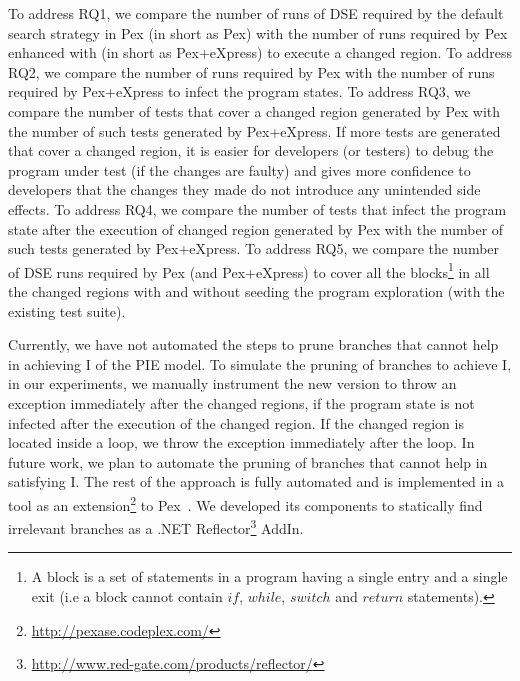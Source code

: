  To address RQ1, we compare the number of runs of DSE required by the default search strategy in Pex (in short as Pex) with the number of runs required by Pex enhanced with  (in short as Pex+eXpress) to execute a changed region. To address RQ2, we compare the number of runs required by Pex with the number of runs required by Pex+eXpress to infect the program states. 
To address RQ3, we compare the number of tests that cover a changed region generated by Pex with the number of such tests generated by Pex+eXpress. If more tests are generated that cover a changed region, it is easier for developers (or testers) to debug the program under test (if the changes are faulty) and gives more confidence to developers that the changes they made do not introduce any unintended side effects.
To address RQ4, we compare the number of tests that infect the program state after the execution of changed region generated by Pex with the number of such tests generated by Pex+eXpress. To address RQ5, we compare the number of DSE runs required by Pex (and Pex+eXpress) to cover all the blocks\footnote{A block is a set of statements in a program having a single entry and a single exit (i.e a block cannot contain $if$, $while$, $switch$ and $return$ statements).} in all the changed regions with and without seeding the program exploration (with the existing test suite).


Currently, we have not automated the steps to prune branches that cannot help in achieving I of the PIE model. To simulate the pruning of branches to achieve I, in our experiments, we manually instrument the new version to throw an exception immediately  after the changed regions, if the program state is not infected after the execution of the changed region. If the changed region is located inside a loop, we throw the exception immediately after the loop.
In future work, we plan to automate the pruning of branches that cannot help in satisfying I. 
The rest of the approach is fully automated and is implemented in a tool as an extension\footnote{\url{http://pexase.codeplex.com/}} to Pex~\cite{Pex}. We developed its components to statically find irrelevant branches as a .NET Reflector\footnote{\url{http://www.red-gate.com/products/reflector/}} AddIn.



